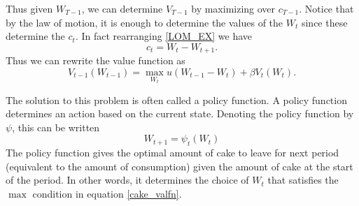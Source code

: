 Thus given $W_{T-1}$, we can determine $V_{T-1}$ by maximizing over $c_{T-1}$.  Notice that by the law of motion, it is enough to determine the values of the $W_t$ since these determine the $c_t$.  In fact rearranging \eqref{LOM_EX} we have
\begin{equation*}
c_t = W_t - W_{t+1}.
\end{equation*}
Thus we can rewrite the value function as
\begin{equation}
V_{t-1}(W_{t-1}) = \max_{W_t} u(W_{t-1} - W_{t}) + \beta V_t(W_t).
\label{cake_valfn}
\end{equation}

The solution to this problem is often called a policy function.  A policy function determines an action based on the current state.  Denoting the policy function by $\psi$, this can be written
\begin{equation*}
W_{t+1}=\psi_t \left(W_t\right)
\end{equation*}
The policy function gives the optimal amount of cake to leave for next period (equivalent to the amount of consumption) given the amount of cake at the start of the period.  In other words, it determines the choice of $W_t$ that satisfies the $\max$ condition in equation \eqref{cake_valfn}.

